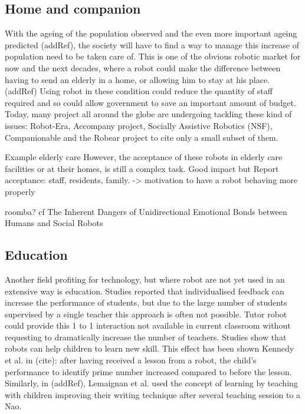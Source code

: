 	
	

	\subsection{Home and companion}
	
		With the ageing of the population observed and the even more important ageing predicted (addRef), the society will have to find a way to manage this increase of population need to be taken care of. This is one of the obvious robotic market for now and the next decades, where a robot could make the difference between having to send an elderly in a home, or allowing him to stay at his place. (addRef) Using robot in these condition could reduce the quantity of staff required and so could allow government to save an important amount of budget. Today, many project all around the globe are undergoing tackling these kind of issues: Robot-Era, Accompany project, Socially Assistive Robotics (NSF), Companionable and the Robear project to cite only a small subset of them.
		
Example elderly care		
However, the acceptance of these robots in elderly care facilities or at their homes, is still a complex task. Good impact \cite{wada2004effects} but Report acceptance: staff, residents, family. -> motivation to have a robot behaving more properly
		
		roomba? cf The Inherent Dangers of Unidirectional Emotional Bonds between Humans and Social Robots
		
	\subsection{Education} 

	Another field profiting for technology, but where robot are not yet used in an extensive way is education. Studies reported that individualised feedback can increase the performance of students, but due to the large number of students supervised by a single teacher this approach is often not possible. Tutor robot could provide this 1 to 1 interaction not available in current classroom without requesting to dramatically increase the number of teachers. Studies show that robots can help children to learn new skill. This effect has been shown Kennedy et al. in (cite): after having received a lesson from a robot, the child's performance to identify prime number increased compared to before the lesson. Similarly, in (addRef), Lemaignan et al. used the concept of learning by teaching with children improving their writing technique after several teaching session to a Nao.
	
